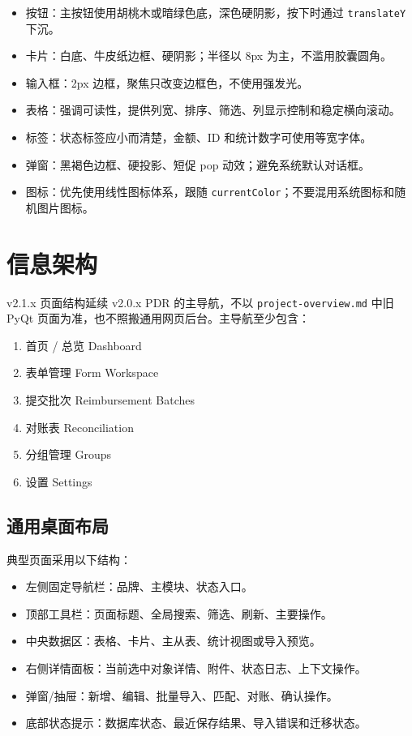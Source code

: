 \documentclass[UTF8,zihao=-4]{ctexart}
\begin{document}
\begin{itemize}
  \item 按钮：主按钮使用胡桃木或暗绿色底，深色硬阴影，按下时通过 \texttt{translateY} 下沉。
  \item 卡片：白底、牛皮纸边框、硬阴影；半径以 8px 为主，不滥用胶囊圆角。
  \item 输入框：2px 边框，聚焦只改变边框色，不使用强发光。
  \item 表格：强调可读性，提供列宽、排序、筛选、列显示控制和稳定横向滚动。
  \item 标签：状态标签应小而清楚，金额、ID 和统计数字可使用等宽字体。
  \item 弹窗：黑褐色边框、硬投影、短促 pop 动效；避免系统默认对话框。
  \item 图标：优先使用线性图标体系，跟随 \texttt{currentColor}；不要混用系统图标和随机图片图标。
\end{itemize}

\section{信息架构}

v2.1.x 页面结构延续 v2.0.x PDR 的主导航，不以 \texttt{project-overview.md} 中旧 PyQt 页面为准，也不照搬通用网页后台。主导航至少包含：

\begin{enumerate}
  \item 首页 / 总览 Dashboard
  \item 表单管理 Form Workspace
  \item 提交批次 Reimbursement Batches
  \item 对账表 Reconciliation
  \item 分组管理 Groups
  \item 设置 Settings
\end{enumerate}

\subsection{通用桌面布局}

典型页面采用以下结构：

\begin{itemize}
  \item 左侧固定导航栏：品牌、主模块、状态入口。
  \item 顶部工具栏：页面标题、全局搜索、筛选、刷新、主要操作。
  \item 中央数据区：表格、卡片、主从表、统计视图或导入预览。
  \item 右侧详情面板：当前选中对象详情、附件、状态日志、上下文操作。
  \item 弹窗/抽屉：新增、编辑、批量导入、匹配、对账、确认操作。
  \item 底部状态提示：数据库状态、最近保存结果、导入错误和迁移状态。
\end{itemize}
\end{document}
